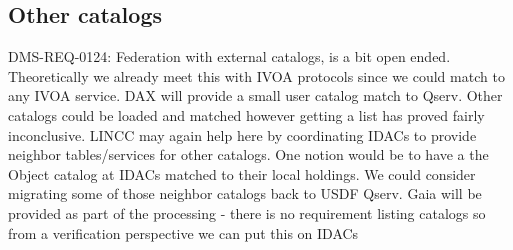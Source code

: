 \subsection{Other catalogs}

DMS-REQ-0124: Federation with external catalogs, is a bit open ended.
Theoretically we already meet this with IVOA protocols since we could match to any IVOA service.
DAX will provide a small user catalog match to Qserv.
Other catalogs could be loaded and matched however getting a list has proved fairly inconclusive.
LINCC may again help here by coordinating IDACs to provide neighbor tables/services for other catalogs.
One notion would be to have a the Object catalog at IDACs matched to their local holdings.
We could consider migrating some of those neighbor catalogs back to USDF Qserv.
Gaia will be provided as part of the processing - there is no requirement listing catalogs so from a verification perspective we can put this on IDACs

